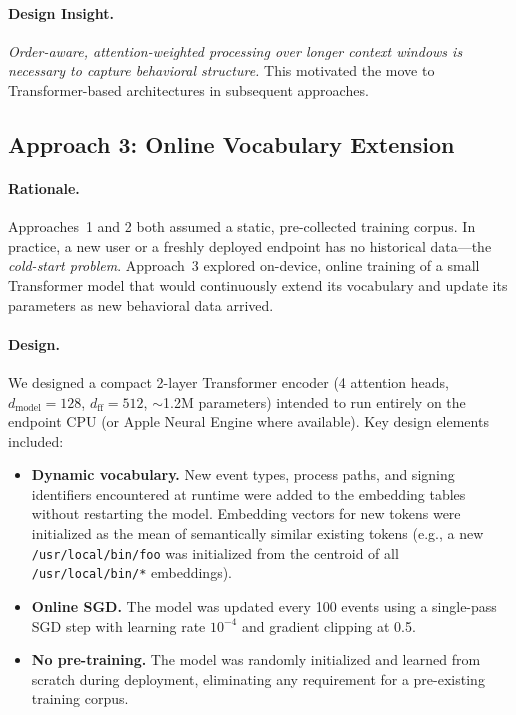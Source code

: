 \documentclass[letterpaper,twocolumn,10pt]{article}
\begin{document}
\paragraph{Design Insight.}
\emph{Order-aware, attention-weighted processing over longer
context windows is necessary to capture behavioral structure.}
This motivated the move to Transformer-based architectures in
subsequent approaches.


\subsection{Approach 3: Online Vocabulary Extension}
\label{sec:a3}

\paragraph{Rationale.}
Approaches~1 and 2 both assumed a static, pre-collected training
corpus.  In practice, a new user or a freshly deployed endpoint has
no historical data---the \emph{cold-start problem}.  Approach~3
explored on-device, online training of a small Transformer model
that would continuously extend its vocabulary and update its
parameters as new behavioral data arrived.

\paragraph{Design.}
We designed a compact 2-layer Transformer encoder (4 attention
heads, $d_\text{model}=128$, $d_\text{ff}=512$, $\sim$1.2M
parameters) intended to run entirely on the endpoint CPU (or Apple
Neural Engine where available).  Key design elements included:

\begin{itemize}[nosep,leftmargin=*]
\item \textbf{Dynamic vocabulary.}  New event types, process
  paths, and signing identifiers encountered at runtime were added
  to the embedding tables without restarting the model.  Embedding
  vectors for new tokens were initialized as the mean of
  semantically similar existing tokens (e.g., a new
  \texttt{/usr/local/bin/foo} was initialized from the centroid of
  all \texttt{/usr/local/bin/*} embeddings).

\item \textbf{Online SGD.}  The model was updated every 100 events
  using a single-pass SGD step with learning rate $10^{-4}$ and
  gradient clipping at 0.5.

\item \textbf{No pre-training.}  The model was randomly initialized
  and learned from scratch during deployment, eliminating any
  requirement for a pre-existing training corpus.
\end{itemize}
\end{document}
